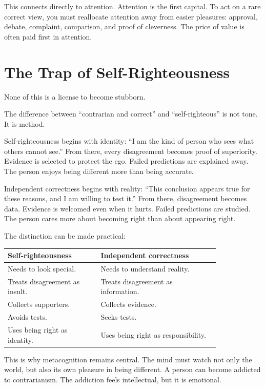 This connects directly to attention. Attention is the first capital. To act on a rare correct view, you must reallocate attention away from easier pleasures: approval, debate, complaint, comparison, and proof of cleverness. The price of value is often paid first in attention.

\section*{The Trap of Self-Righteousness}

None of this is a license to become stubborn.

The difference between ``contrarian and correct'' and ``self-righteous'' is not tone. It is method.

Self-righteousness begins with identity: ``I am the kind of person who sees what others cannot see.'' From there, every disagreement becomes proof of superiority. Evidence is selected to protect the ego. Failed predictions are explained away. The person enjoys being different more than being accurate.

Independent correctness begins with reality: ``This conclusion appears true for these reasons, and I am willing to test it.'' From there, disagreement becomes data. Evidence is welcomed even when it hurts. Failed predictions are studied. The person cares more about becoming right than about appearing right.

The distinction can be made practical:

\begin{center}
\begin{tabular}{p{0.36\linewidth}p{0.46\linewidth}}
\hline
Self-righteousness & Independent correctness \\
\hline
Needs to look special. & Needs to understand reality. \\
Treats disagreement as insult. & Treats disagreement as information. \\
Collects supporters. & Collects evidence. \\
Avoids tests. & Seeks tests. \\
Uses being right as identity. & Uses being right as responsibility. \\
\hline
\end{tabular}
\end{center}

This is why metacognition remains central. The mind must watch not only the world, but also its own pleasure in being different. A person can become addicted to contrarianism. The addiction feels intellectual, but it is emotional.

